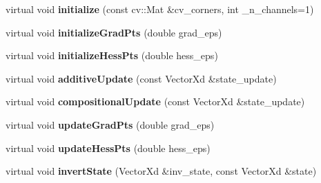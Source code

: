 \begin{DoxyCompactItemize}
\item 
\hypertarget{classStateSpaceModel_a349ef13226d8ed790b8d74ef63439ca8}{virtual void {\bfseries initialize} (const cv\-::\-Mat \&cv\-\_\-corners, int \-\_\-n\-\_\-channels=1)}\label{classStateSpaceModel_a349ef13226d8ed790b8d74ef63439ca8}

\item 
\hypertarget{classStateSpaceModel_a9c16a921e2f1a9a909e776fd54212251}{virtual void {\bfseries initialize\-Grad\-Pts} (double grad\-\_\-eps)}\label{classStateSpaceModel_a9c16a921e2f1a9a909e776fd54212251}

\item 
\hypertarget{classStateSpaceModel_ad6598c85748f7b2906b9134a32b44383}{virtual void {\bfseries initialize\-Hess\-Pts} (double hess\-\_\-eps)}\label{classStateSpaceModel_ad6598c85748f7b2906b9134a32b44383}

\item 
\hypertarget{classStateSpaceModel_aa1e1e988c331faa9869965f0b3a2190c}{virtual void {\bfseries additive\-Update} (const Vector\-Xd \&state\-\_\-update)}\label{classStateSpaceModel_aa1e1e988c331faa9869965f0b3a2190c}

\item 
\hypertarget{classStateSpaceModel_afc3fbcc3f2dcc6e555289e1d0f3e156c}{virtual void {\bfseries compositional\-Update} (const Vector\-Xd \&state\-\_\-update)}\label{classStateSpaceModel_afc3fbcc3f2dcc6e555289e1d0f3e156c}

\item 
\hypertarget{classStateSpaceModel_a43ddc8f9b4c2551c9ec6b200ca0db5ca}{virtual void {\bfseries update\-Grad\-Pts} (double grad\-\_\-eps)}\label{classStateSpaceModel_a43ddc8f9b4c2551c9ec6b200ca0db5ca}

\item 
\hypertarget{classStateSpaceModel_a1001d4563a839aadad2b59d5c1ea4847}{virtual void {\bfseries update\-Hess\-Pts} (double hess\-\_\-eps)}\label{classStateSpaceModel_a1001d4563a839aadad2b59d5c1ea4847}

\item 
\hypertarget{classStateSpaceModel_a4273b406876eaae7afaa18d954955c0b}{virtual void {\bfseries invert\-State} (Vector\-Xd \&inv\-\_\-state, const Vector\-Xd \&state)}\label{classStateSpaceModel_a4273b406876eaae7afaa18d954955c0b}


\end{DoxyCompactItemize}
